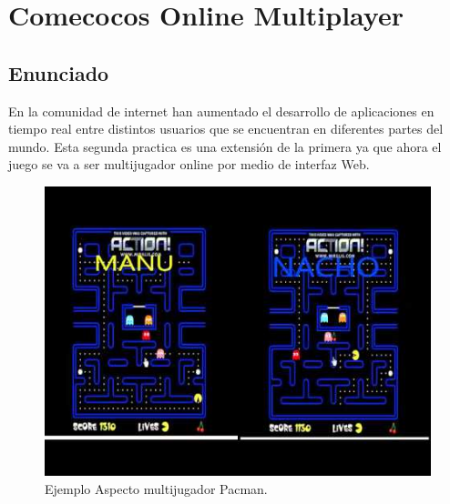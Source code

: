 \chapter{Comecocos Online Multiplayer}
\section{Enunciado}
En la comunidad de internet han aumentado el desarrollo de aplicaciones en tiempo real entre distintos usuarios que se encuentran en diferentes partes del mundo.
Esta segunda practica es una extensión de la primera ya que ahora el juego se va a ser multijugador online por medio de interfaz Web.
\begin{figure}[!h]
\begin{center}
  \includegraphics[width=0.5\linewidth]{Figures/introMultiplayer}
	\decoRule
	\caption[Ejemplo Aspecto multijugador Pacman]{Ejemplo Aspecto multijugador Pacman.}
\label{fig:Pacman_Intro2}
\end{center}
\end{figure}
